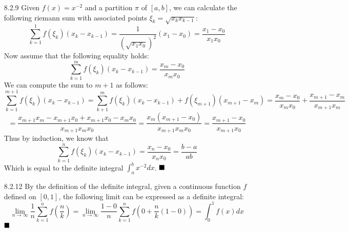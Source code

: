 \documentclass[11pt]{article}
\newcommand{\done}{\ensuremath{
    \strut\hfill\blacksquare
}}
\newcommand{\parens}[1]{\left(#1\right)}             %
\newcommand{\lm}[1]{\displaystyle\lim_{#1}}
\begin{document}
\pagestyle{fancy}
\fancyhead{}

\normalsize

\begin{itemize}
    \item [8.2.9] Given $f(x)=x^{-2}$ and a partition $\pi$ of $[a,b]$, we can calculate the following riemann sum with associated points $\xi_k=\sqrt{x_kx_{k-1}}$:
    \[\sum_{k=1}^1f(\xi_k)(x_k-x_{k-1})=\frac{1}{\parens{\sqrt{x_1x_0}}^2}(x_1-x_0)=\frac{x_1-x_0}{x_1x_0}\]
    Now assume that the following equality holds:
    \[\sum_{k=1}^mf(\xi_k)(x_k-x_{k-1})=\frac{x_m-x_0}{x_mx_0}\]
    We can compute the sum to $m+1$ as follows:
    \[\sum_{k=1}^{m+1}f(\xi_k)(x_k-x_{k-1})=\sum_{k+1}^mf(\xi_k)(x_k-x_{k-1})+f(\xi_{m+1})(x_{m+1}-x_m)=\frac{x_m-x_0}{x_mx_0}+\frac{x_{m+1}-x_m}{x_{m+1}x_m}\]
    \[=\frac{x_{m+1}x_m-x_{m+1}x_0+x_{m+1}x_0-x_mx_0}{x_{m+1}x_mx_0}=\frac{x_m(x_{m+1}-x_0)}{x_{m+1}x_mx_0}=\frac{x_{m+1}-x_0}{x_{m+1}x_0}\]
    Thus by induction, we know that
    \[\sum_{k=1}^nf(\xi_k)(x_k-x_{k-1})=\frac{x_n-x_0}{x_nx_0}=\frac{b-a}{ab}\]
    Which is equal to the definite integral $\int_a^bx^{-2}dx$. \done

    \item [8.2.12] By the definition of the definite integral, given a continuous function $f$ defined on $[0,1]$, the following limit can be expressed as a definite integral:
    \[\lm{n\to\infty}\frac{1}{n}\sum_{k=1}^nf\parens{\frac{n}{k}}=\lm{n\to\infty}\frac{1-0}{n}\sum_{k=1}^nf\parens{0+\frac{n}{k}(1-0)}=\int_0^1f(x)dx\]
    \done
\end{itemize}
\end{document}
